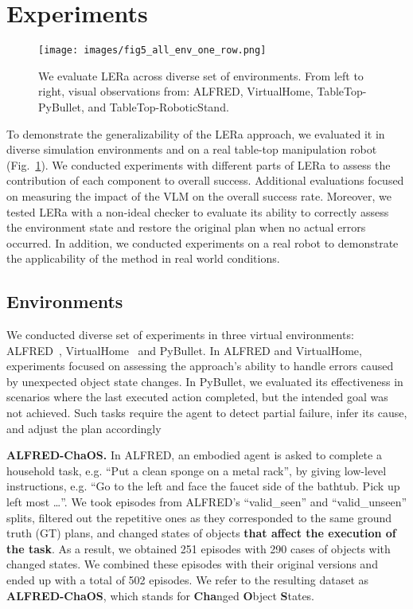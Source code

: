 \documentclass[letterpaper, 10 pt, conference]{ieeeconf}  %
\begin{document}
\section{Experiments}
\label{sec:experiments}
\begin{figure}[ht]
    \centering
    \texttt{[image: images/fig5\_all\_env\_one\_row.png]}
    \caption{We evaluate LERa across diverse set of environments. From left to right, visual observations from: ALFRED, VirtualHome, TableTop-PyBullet, and TableTop-RoboticStand.
    \vspace{-30pt}
    }
    \label{fig:all-envs}
\end{figure}
To demonstrate the generalizability of the LERa approach, we evaluated it in diverse simulation environments and on a real table-top manipulation robot (Fig.~\ref{fig:all-envs}). We conducted experiments with different parts of LERa to assess the contribution of each component to overall success. Additional evaluations focused on measuring the impact of the VLM on the overall success rate. Moreover, we tested LERa with a non-ideal checker to evaluate its ability to correctly assess the environment state and restore the original plan when no actual errors occurred. In addition, we conducted experiments on a real robot to demonstrate the applicability of the method in real world conditions.

\subsection{Environments}
We conducted diverse set of experiments in three virtual environments: ALFRED~\cite{shridhar2020alfred}, VirtualHome~\cite{puig2018virtualhome} and PyBullet. In ALFRED and VirtualHome, experiments focused on assessing the approach’s ability to handle errors caused by unexpected object state changes. In PyBullet, we evaluated its effectiveness in scenarios where the last executed action completed, but the intended goal was not achieved. Such tasks require the agent to detect partial failure, infer its cause, and adjust the plan accordingly

\textbf{ALFRED-ChaOS.}
In ALFRED, an embodied agent is asked to complete a household task, e.g. ``Put a clean sponge on a metal rack'', by giving low-level instructions, e.g. ``Go to the left and face the faucet side of the bathtub. Pick up left most \dots''. We took episodes from ALFRED's ``valid\_seen'' and ``valid\_unseen'' splits, filtered out the repetitive ones as they corresponded to the same ground truth (GT) plans, and changed states of objects \textbf{that affect the execution of the task}. As a result, we obtained 251 episodes with 290 cases of objects with changed states. We combined these episodes with their original versions and ended up with a total of 502 episodes. We refer to the resulting dataset as \textbf{ALFRED-ChaOS}, which stands for \textbf{Cha}nged \textbf{O}bject \textbf{S}tates.
\end{document}
